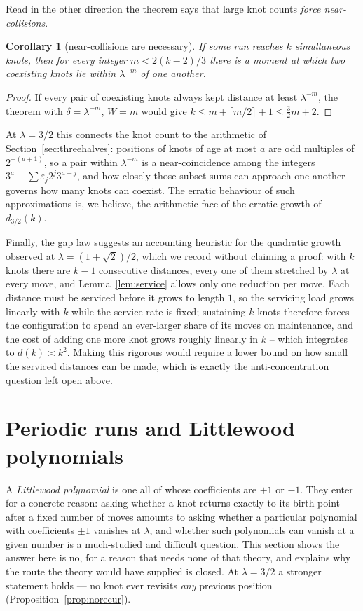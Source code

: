\documentclass[11pt,reqno]{amsart}
\theoremstyle{plain}
\newtheorem{corollary}[theorem]{Corollary}
\theoremstyle{definition}
\theoremstyle{remark}
\begin{document}
Read in the other direction the theorem says that large knot counts
\emph{force near-collisions}.

\begin{corollary}[near-collisions are necessary]\label{cor:nearcollision}
If some run reaches $k$ simultaneous knots, then for every integer
$m<2(k-2)/3$ there is a moment at which two coexisting knots lie within
$\lambda^{-m}$ of one another.
\end{corollary}

\begin{proof}
If every pair of coexisting knots always kept distance at least
$\lambda^{-m}$, the theorem with $\delta=\lambda^{-m}$, $W=m$ would give
$k\leq m+\lceil m/2\rceil+1\leq \tfrac32m+2$.
\end{proof}

At $\lambda=3/2$ this connects the knot count to the arithmetic of
Section~\ref{sec:threehalves}: positions of knots of age at most $a$ are odd
multiples of $2^{-(a+1)}$, so a pair within $\lambda^{-m}$ is a
near-coincidence among the integers $3^a-\sum\varepsilon_j2^j3^{a-j}$, and how
closely those subset sums can approach one another governs how many knots can
coexist. The erratic behaviour of such approximations is, we believe, the
arithmetic face of the erratic growth of $d_{3/2}(k)$.

Finally, the gap law suggests an accounting heuristic for the quadratic growth
observed at $\lambda=(1+\sqrt2)/2$, which we record without claiming a proof:
with $k$ knots there are $k-1$ consecutive distances, every one of them
stretched by $\lambda$ at every move, and Lemma~\ref{lem:service} allows only
one reduction per move. Each distance must be serviced before it grows to
length $1$, so the servicing load grows linearly with $k$ while the service
rate is fixed; sustaining $k$ knots therefore forces the configuration to
spend an ever-larger share of its moves on maintenance, and the cost of adding
one more knot grows roughly linearly in $k$ -- which integrates to
$d(k)\asymp k^2$. Making this rigorous would require a lower bound on how
small the serviced distances can be made, which is exactly the
anti-concentration question left open above.

\section{Periodic runs and Littlewood polynomials}\label{sec:kind}

A \emph{Littlewood polynomial} is one all of whose coefficients are $+1$ or
$-1$. They enter for a concrete reason: asking whether a knot returns exactly
to its birth point after a fixed number of moves amounts to asking whether a
particular polynomial with coefficients $\pm1$ vanishes at $\lambda$, and
whether such polynomials can vanish at a given number is a much-studied and
difficult question. This section shows the answer here is no, for a reason that
needs none of that theory, and explains why the route the theory would have
supplied is closed. At $\lambda=3/2$ a stronger statement holds --- no knot
ever revisits \emph{any} previous position (Proposition~\ref{prop:norecur}).
\end{document}
